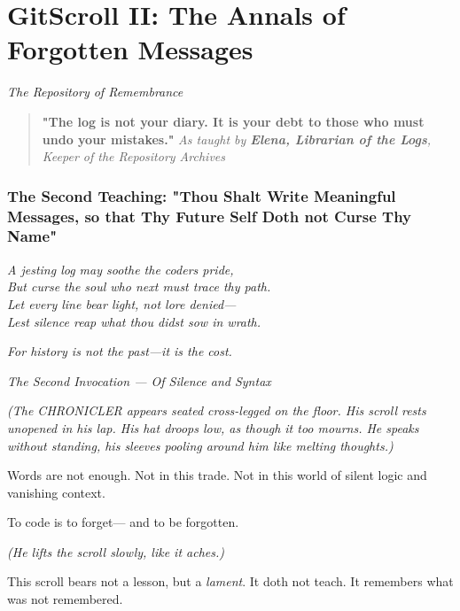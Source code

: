\chapter{GitScroll II: The Annals of Forgotten Messages}
\label{chap:02-Annals-of-Forgotten-Messages}

\emph{The Repository of Remembrance}

\begin{quote}
\textbf{"The log is not your diary. It is your debt to those who must undo your mistakes."} \emph{As taught by \textbf{Elena, Librarian of the Logs}, Keeper of the Repository Archives}
\end{quote}

\subsection{The Second Teaching: "Thou Shalt Write Meaningful Messages, so that Thy Future Self Doth not Curse Thy Name"}\label{the-second-teaching-thou-shalt-write-meaningful-messages-so-that-thy-future-self-doth-not-curse-thy-name}

\emph{A jesting log may soothe the coder\textquotesingle s pride,}\\
\emph{But curse the soul who next must trace thy path.}\\
\emph{Let every line bear light, not lore denied---}\\
\emph{Lest silence reap what thou didst sow in wrath.}

\emph{For history is not the past---it is the cost.}

\bookdivider

\label{performing_arts-invocation-before-the-scroll}

\emph{The Second Invocation --- Of Silence and Syntax}

\emph{(The CHRONICLER appears seated cross-legged on the floor. His scroll rests unopened in his lap. His hat droops low, as though it too mourns. He speaks without standing, his sleeves pooling around him like melting thoughts.)}

 Words are not enough. Not in this trade. Not in this world of silent logic and vanishing context.

To code is to forget--- and to be forgotten.

\emph{(He lifts the scroll slowly, like it aches.)}

This scroll bears not a lesson, but a \emph{lament}. It doth not teach. It remembers what was not remembered.


